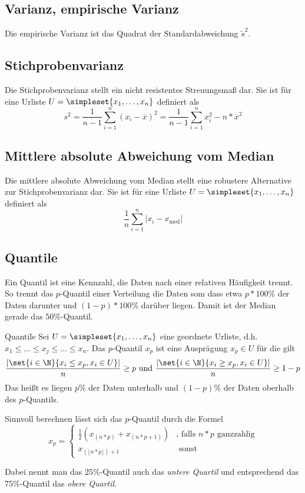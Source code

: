 \subsection{Varianz, empirische Varianz}
Die empirische Varianz ist das Quadrat der Standardabweichung $\tilde s^2$.

\subsection{Stichprobenvarianz}
Die Stichprobenvarianz stellt ein nicht resistentes Streuungsmaß dar. Sie ist für eine Urliste $U=\simpleset{x_1,\ldots,x_n}$ definiert als
\begin{equation*}
	s^2=\frac{1}{n-1}\sum_{i=1}^n (x_i-\overline x)^2=\frac{1}{n-1}\sum_{i=1}^n x_i^2 - n*\overline x^2
\end{equation*}

\subsection{Mittlere absolute Abweichung vom Median}
Die mittlere absolute Abweichung vom Median stellt eine robustere Alternative zur Stichprobenvarianz dar. Sie ist für eine Urliste $U=\simpleset{x_1,\ldots,x_n}$ definiert als 
\begin{equation*}
	\frac 1n\sum_{i=1}^n|x_i-x_{\operatorname{med}}|
\end{equation*}


\subsection{Quantile}
Ein Quantil ist eine Kennzahl, die Daten nach einer relativen Häufigkeit trennt. So trennt das $p$-Quantil einer Verteilung die Daten som dass etwa $p*100\%$ der Daten darunter und $(1-p)*100\%$ darüber liegen. Damit ist der Median gerade das $50\%$-Quantil.

\begin{definition}{Quantile}
	Sei $U=\simpleset{x_1,\ldots,x_n}$ eine geordnete Urliste, d.h. $x_1\leq\ldots\leq x_j\leq\ldots\leq x_n$. Das $p$-Quantil $x_p$ ist eine Ausprägung $x_p\in U$ für die gilt
	\begin{equation*}
		\frac{\left|\set{i\in\N}{x_i\leq x_p, x_i\in U}\right|}{n}\geq p \text{ und } \frac{\left|\set{i\in\N}{x_i\geq x_p, x_i\in U}\right|}{n}\geq 1-p
	\end{equation*}
	Das heißt es liegen $p\%$ der Daten unterhalb und $(1-p)\%$ der Daten oberhalb des $p$-Quantils.

	Sinnvoll berechnen lässt sich das $p$-Quantil durch die Formel
	\begin{equation*}
		x_p=\begin{cases}
			\frac12(x_{(n*p)}+x_{(n*p+1)}) &\text{, falls $n*p$ ganzzahlig}\\
			x_{(\lfloor n*p\rfloor)+1} &\text{ sonst}
		\end{cases}
	\end{equation*}
\end{definition}
Dabei nennt man das $25\%$-Quantil auch das \emph{untere Quartil} und entsprechend das $75\%$-Quantil das \emph{obere Quartil}.

